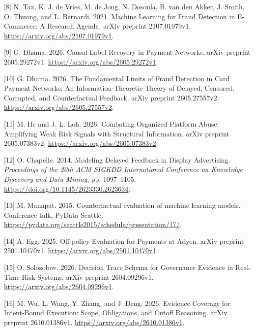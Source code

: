 \documentclass[
  11pt,
]{article}
\newlength{\cslhangindent}
\newlength{\cslentryspacingunit} %
\newenvironment{CSLReferences}[2] %
 {%
  \setlength{\parindent}{0pt}
  \ifodd #1
  \let\oldpar\par
  \def\par{\hangindent=\cslhangindent\oldpar}
  \fi
  \setlength{\parskip}{#2\cslentryspacingunit}
 }%
 {}
\begin{document}
\begin{CSLReferences}{1}{1}
\leavevmode{}%
{[}8{]} N. Tax, K. J. de Vries, M. de Jong, N. Dosoula, B. van den
Akker, J. Smith, O. Thuong, and L. Bernardi. 2021. Machine Learning for
Fraud Detection in E-Commerce: A Research Agenda. arXiv preprint
2107.01979v1. \url{https://arxiv.org/abs/2107.01979v1}.

\leavevmode{}%
{[}9{]} G. Dhama. 2026. Causal Label Recovery in Payment Networks. arXiv
preprint 2605.29272v1. \url{https://arxiv.org/abs/2605.29272v1}.

\leavevmode{}%
{[}10{]} G. Dhama. 2026. The Fundamental Limits of Fraud Detection in
Card Payment Networks: An Information-Theoretic Theory of Delayed,
Censored, Corrupted, and Counterfactual Feedback. arXiv preprint
2605.27557v2. \url{https://arxiv.org/abs/2605.27557v2}.

\leavevmode{}%
{[}11{]} M. He and J. L. Loh. 2026. Combating Organized Platform Abuse:
Amplifying Weak Risk Signals with Structural Information. arXiv preprint
2605.07383v2. \url{https://arxiv.org/abs/2605.07383v2}.

\leavevmode{}%
{[}12{]} O. Chapelle. 2014. Modeling Delayed Feedback in Display
Advertising. \emph{Proceedings of the 20th ACM SIGKDD International
Conference on Knowledge Discovery and Data Mining}, pp. 1097--1105.
\url{https://doi.org/10.1145/2623330.2623634}.

\leavevmode{}%
{[}13{]} M. Manapat. 2015. Counterfactual evaluation of machine learning
models. Conference talk, PyData Seattle.
\url{https://pydata.org/seattle2015/schedule/presentation/17/}.

\leavevmode{}%
{[}14{]} A. Egg. 2025. Off-policy Evaluation for Payments at Adyen.
arXiv preprint 2501.10470v1. \url{https://arxiv.org/abs/2501.10470v1}.

\leavevmode{}%
{[}15{]} O. Solozobov. 2026. Decision Trace Schema for Governance
Evidence in Real-Time Risk Systems. arXiv preprint 2604.09296v1.
\url{https://arxiv.org/abs/2604.09296v1}.

\leavevmode{}%
{[}16{]} M. Wu, L. Wang, Y. Zhang, and J. Deng. 2026. Evidence Coverage
for Intent-Bound Execution: Scope, Obligations, and Cutoff Reasoning.
arXiv preprint 2610.01386v1. \url{https://arxiv.org/abs/2610.01386v1}.


\end{CSLReferences}
\end{document}

